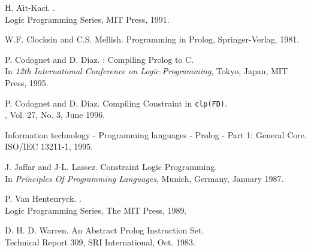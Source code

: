 \newpage
{}
\begin{thebibliography}{99}

 H. A\"{\i}t-Kaci.
. \\
\newblock Logic Programming Series, MIT Press, 1991. \\
\newblock {}

 W.F. Clocksin and C.S. Mellish.
\newblock Programming in Prolog, Springer-Verlag, 1981.

 P. Codognet and D. Diaz.
: Compiling Prolog to C.\\
\newblock In {\em 12th International Conference on Logic Programming},
Tokyo, Japan, MIT Press, 1995. \\
\newblock {}

 P. Codognet and D. Diaz.
\newblock Compiling Constraint in {\tt clp(FD)}. \\
, Vol. 27, No. 3, June 1996. \\
\newblock {}

\newblock Information technology - Programming languages - Prolog - Part 1:
General Core. \\
\newblock ISO/IEC 13211-1, 1995.
\newblock {}

 J. Jaffar and J-L. Lassez.
\newblock Constraint Logic Programming. \\
\newblock In {\em Principles Of Programming Languages},
Munich, Germany, January 1987. 

 P. Van Hentenryck.
. \\
\newblock Logic Programming Series, The MIT Press, 1989.

 D. H. D. Warren.
\newblock An Abstract Prolog Instruction Set. \\
\newblock Technical Report 309, SRI International, Oct. 1983.

\end{thebibliography}
